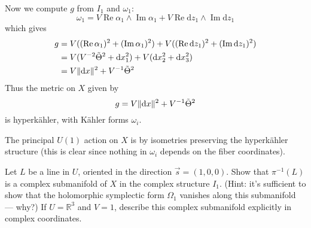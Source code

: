 \documentclass[12pt,letterpaper,reqno]{article}
\numberwithin{equation}{section}
\newcommand{\R}{\ensuremath{\mathbb R}}
\newcommand{\kahler}{K\"ahler\xspace}
\newcommand{\hk}{hyperk\"ahler\xspace}
\newcommand{\de}{\mathrm{d}}
\newcommand{\norm}[1]{\lVert#1\rVert}
\DeclareMathOperator{\im}{Im}
\DeclareMathOperator{\re}{Re}
\begin{document}
\begin{example}
Now we compute $g$ from $I_1$ and $\omega_1$:
\begin{equation}
  \omega_1 = V \re \alpha_1 \wedge \im \alpha_1 + V \re \de z_1 \wedge \im \de z_1
\end{equation}
which gives
\begin{align}
  g &= V ((\re \alpha_1)^2 + (\im \alpha_1)^2) + V ((\re \de z_1)^2 + (\im \de z_1)^2) \\
  &= V (V^{-2} \tTheta^2 + \de x_1^2) + V (\de x_2^2 + \de x_3^2) \\
  &= V \norm{\de x}^2 + V^{-1} \tTheta^2
\end{align}
Thus the metric on $X$ given by
\begin{equation} \label{eq:gibbons-hawking-metric}
  g = V \norm{\de x}^2 + V^{-1} \tTheta^2
\end{equation}
is \hk, with \kahler forms $\omega_i$.

The principal $U(1)$ action on $X$ is by isometries preserving
the \hk structure (this is clear since nothing in $\omega_i$
depends on the fiber coordinates).
\end{example}

\begin{exercise} \label{exc:preimages-of-lines}
Let $L$ be a line in $U$, oriented
in the direction $\vec s = (1,0,0)$.
Show that $\pi^{-1}(L)$ is a complex submanifold of $X$
in the complex structure $I_1$. (Hint: it's sufficient
to show that the holomorphic symplectic form $\Omega_1$ vanishes
along this submanifold --- why?) If $U = \R^3$ and $V=1$,
describe this complex submanifold explicitly in complex coordinates.
\end{exercise}
\end{document}

